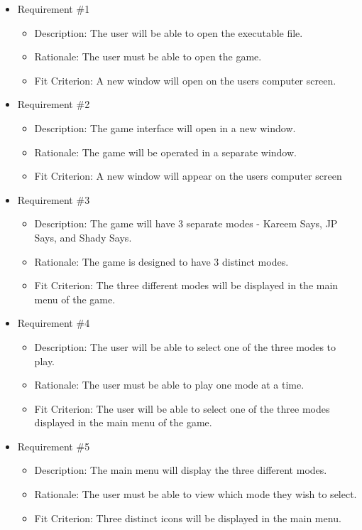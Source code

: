 \documentclass[12pt, titlepage]{article}
\begin{document}
\begin{itemize}

\item Requirement \#1
\begin{itemize}
\item Description: The user will be able to open the executable file.
\item Rationale: The user must be able to open the game.
\item Fit Criterion: A new window will open on the users computer screen.
\end{itemize}

\item Requirement \#2
\begin{itemize}
\item Description: The game interface will open in a new window.
\item Rationale: The game will be operated in a separate window. 
\item Fit Criterion: A new window will appear on the users computer screen
\end{itemize}

\item Requirement \#3
\begin{itemize}
\item Description: The game will have 3 separate modes - Kareem Says, JP Says, and Shady Says.
\item Rationale: The game is designed to have 3 distinct modes.
\item Fit Criterion: The three different modes will be displayed in the main menu of the game. 
\end{itemize}

\item Requirement \#4
\begin{itemize}
\item Description: The user will be able to select one of the three modes to play.
\item Rationale: The user must be able to play one mode at a time. 
\item Fit Criterion: The user will be able to select one of the three modes displayed in the main menu of the game.
\end{itemize}

\item Requirement \#5
\begin{itemize}
\item Description: The main menu will display the three different modes. 
\item Rationale: The user must be able to view which mode they wish to select.
\item Fit Criterion: Three distinct icons will be displayed in the main menu.
\end{itemize}


\end{itemize}
\end{document}
